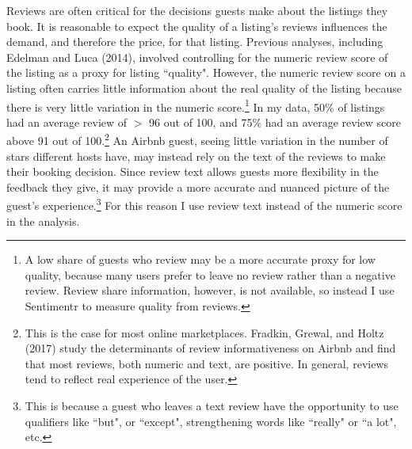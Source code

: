 \documentclass[11pt, oneside]{article}
\begin{document}
Reviews are often critical for the decisions guests make about the listings they book. It is reasonable to expect the quality of a listing's reviews influences the demand, and therefore the price, for that listing. Previous analyses, including Edelman and Luca (2014), involved controlling for the numeric review score of the listing as a proxy for listing ``quality". However, the numeric review score on a listing often carries little information about the real quality of the listing because there is very little variation in the numeric score.\footnote{A low share of guests who review may be a more accurate proxy for low quality, because many users prefer to leave no review rather than a negative review. Review share information, however, is not available, so instead I use Sentimentr to measure quality from reviews.} In my data, 50\% of listings had an average review of $>$ 96 out of 100, and 75\% had an average review score above 91 out of 100.\footnote{This is the case for most online marketplaces. Fradkin, Grewal, and Holtz (2017) study the determinants of review informativeness on Airbnb and find that most reviews, both numeric and text, are positive. In general, reviews tend to reflect real experience of the user.\cite{fradkin}} An Airbnb guest, seeing little variation in the number of stars different hosts have, may instead rely on the text of the reviews to make their booking decision. Since review text allows guests more flexibility in the feedback they give, it may provide a more accurate and nuanced picture of the guest's experience.\footnote{This is because a guest who leaves a text review have the opportunity to use qualifiers like ``but", or ``except", strengthening words like ``really" or ``a lot", etc.} For this reason I use review text instead of the numeric score in the analysis. 
\end{document}
